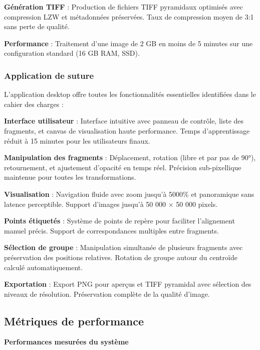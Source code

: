 \documentclass[12pt,a4paper]{report}
\begin{document}
\begin{}
\begin{}
\begin{}
\begin{}
\textbf{Génération TIFF} : Production de fichiers TIFF pyramidaux optimisés avec compression LZW et métadonnées préservées. Taux de compression moyen de 3:1 sans perte de qualité.

\textbf{Performance} : Traitement d'une image de 2 GB en moins de 5 minutes sur une configuration standard (16 GB RAM, SSD).

\subsubsection{Application de suture}

L'application desktop offre toutes les fonctionnalités essentielles identifiées dans le cahier des charges :

\textbf{Interface utilisateur} : Interface intuitive avec panneau de contrôle, liste des fragments, et canvas de visualisation haute performance. Temps d'apprentissage réduit à 15 minutes pour les utilisateurs finaux.

\textbf{Manipulation des fragments} : Déplacement, rotation (libre et par pas de 90°), retournement, et ajustement d'opacité en temps réel. Précision sub-pixellique maintenue pour toutes les transformations.

\textbf{Visualisation} : Navigation fluide avec zoom jusqu'à 5000\% et panoramique sans latence perceptible. Support d'images jusqu'à 50 000 × 50 000 pixels.

\textbf{Points étiquetés} : Système de points de repère pour faciliter l'alignement manuel précis. Support de correspondances multiples entre fragments.

\textbf{Sélection de groupe} : Manipulation simultanée de plusieurs fragments avec préservation des positions relatives. Rotation de groupe autour du centroïde calculé automatiquement.

\textbf{Exportation} : Export PNG pour aperçus et TIFF pyramidal avec sélection des niveaux de résolution. Préservation complète de la qualité d'image.

\subsection{Métriques de performance}

\vspace{1em}
\begin{center}
\textbf{\large Performances mesurées du système}
\end{center}
\vspace{0.5em}


\end{}
\end{}
\end{}
\end{}
\end{document}
